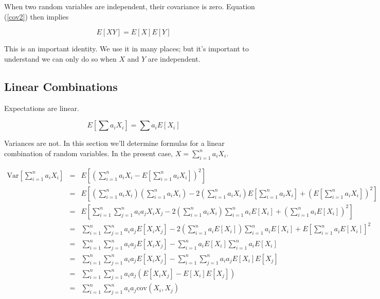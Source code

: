 \documentclass[]{article}
\begin{document}
When two random variables are independent, their covariance
is zero.  Equation (\ref{cov2}) then implies

\begin{equation} \label{cov_zero}
E[XY] = E[X]E[Y]
\end{equation}

This is an important identity.  We use it in many places; but
it's important to understand we can only do so when $X$ and
$Y$ are independent.

\subsection{Linear Combinations}

Expectations are linear.

$$
E\left[ \sum a_i X_i \right] = \sum a_i E[X_i]
$$

Variances are not.  In this section we'll determine
formulas for
a linear combination of random variables.
In the present case, $X = \sum_{i=1}^n a_i X_i$.

\begin{eqnarray}
\mbox{Var}\left[ \sum_{i=1}^n a_i X_i \right] &= &E\left[
    \left( \sum_{i=1}^n a_i X_i - E\left[\sum_{i=1}^n a_i X_i
    \right] \right)^2 \right] \nonumber \\
  &= &E\left[ \left(\sum_{i=1}^n a_i X_i \right)
              \left(\sum_{i=1}^n a_i X_i \right)
     - 2 \left(\sum_{i=1}^n a_i X_i \right) E\left[\sum_{i=1}^n a_i X_i\right]
     + \left( E\left[\sum_{i=1}^n a_i X_i \right] \right)^2
               \right] \nonumber \\
  &= &E\left[ \sum_{i=1}^n \sum_{j=1}^n a_i a_j X_i X_j 
     - 2 \left(\sum_{i=1}^n a_i X_i \right) \sum_{i=1}^n a_i E[X_i]
     + \left( \sum_{i=1}^n a_i E[X_i] \right)^2
               \right] \nonumber \\
  &= &\sum_{i=1}^n \sum_{j=1}^n a_i a_j E[ X_i X_j ]
     - 2 \left(\sum_{i=1}^n a_i E[X_i] \right) \sum_{i=1}^n a_i E[X_i]
     + E\left[ \sum_{i=1}^n a_i E[X_i] \right]^2 \nonumber \\
  &= &\sum_{i=1}^n \sum_{j=1}^n a_i a_j E[ X_i X_j ]
     - \sum_{i=1}^n a_i E[X_i] \sum_{i=1}^n a_i E[X_i] \nonumber \\
  &= &\sum_{i=1}^n \sum_{j=1}^n a_i a_j E[ X_i X_j ]
     - \sum_{i=1}^n \sum_{j=1}^n a_i a_j E[X_i] E[X_j] \nonumber \\
  &= &\sum_{i=1}^n \sum_{j=1}^n a_i a_j (E[ X_i X_j ] 
     - E[X_i] E[X_j]) \nonumber \\
  &= &\sum_{i=1}^n \sum_{j=1}^n a_i a_j \mbox{cov}(X_i, X_j) \label{var_lc}
\end{eqnarray}
\end{document}
